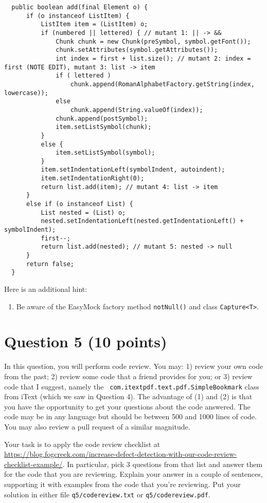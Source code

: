 \documentclass[10pt,hidelinks]{article}
\begin{document}
{\scriptsize
\begin{lstlisting}
  public boolean add(final Element o) {
      if (o instanceof ListItem) {
          ListItem item = (ListItem) o;
          if (numbered || lettered) { // mutant 1: || -> &&
              Chunk chunk = new Chunk(preSymbol, symbol.getFont());
              chunk.setAttributes(symbol.getAttributes());
              int index = first + list.size(); // mutant 2: index = first (NOTE EDIT), mutant 3: list -> item
              if ( lettered )
                  chunk.append(RomanAlphabetFactory.getString(index, lowercase));
              else
                  chunk.append(String.valueOf(index));
              chunk.append(postSymbol);
              item.setListSymbol(chunk);
          }
          else {
              item.setListSymbol(symbol);
          }
          item.setIndentationLeft(symbolIndent, autoindent);
          item.setIndentationRight(0);
          return list.add(item); // mutant 4: list -> item
      }
      else if (o instanceof List) {
          List nested = (List) o;
          nested.setIndentationLeft(nested.getIndentationLeft() + symbolIndent);
          first--;
          return list.add(nested); // mutant 5: nested -> null
      }
      return false;
  }
\end{lstlisting}
}

\vspace*{1em}\noindent
Here is an additional hint:

\begin{enumerate}
\item Be aware of the EasyMock factory method \verb+notNull()+ and class \verb+Capture<T>+.
\end{enumerate}

\section*{Question 5 (10 points)}
In this question, you will perform code review. You may: 1) review
your own code from the past; 2) review some code that a friend
provides for you; or 3) review code that I suggest, namely the {\tt
  com.itextpdf.text.pdf.SimpleBookmark} class from iText (which we saw
in Question 4). The advantage of (1) and (2) is that you have the
opportunity to get your questions about the code answered. The code
may be in any language but should be between 500 and 1000 lines of
code. You may also review a pull request of a similar magnitude.

Your task is to apply the code review checklist at
\url{https://blog.fogcreek.com/increase-defect-detection-with-our-code-review-checklist-example/}. In
particular, pick 3 questions from that list and answer them for the
code that you are reviewing. Explain your answer in a couple of
sentences, supporting it with examples from the code that you're
reviewing. Put your solution in either file {\tt q5/codereview.txt}
or {\tt q5/codereview.pdf}. 



\end{document}
